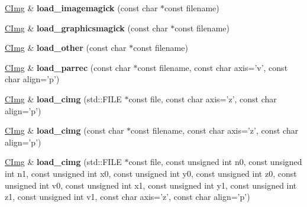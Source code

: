 \begin{DoxyCompactItemize}
\item 
\hypertarget{structcimg__library_1_1_c_img_a3fcf726ab135a8f5fba0cbb0acaaa625}{\hyperlink{structcimg__library_1_1_c_img}{C\-Img} \& {\bfseries load\-\_\-imagemagick} (const char $\ast$const filename)}\label{structcimg__library_1_1_c_img_a3fcf726ab135a8f5fba0cbb0acaaa625}

\item 
\hypertarget{structcimg__library_1_1_c_img_ac74be1e90df344dcc97370a3a4fe8f2b}{\hyperlink{structcimg__library_1_1_c_img}{C\-Img} \& {\bfseries load\-\_\-graphicsmagick} (const char $\ast$const filename)}\label{structcimg__library_1_1_c_img_ac74be1e90df344dcc97370a3a4fe8f2b}

\item 
\hypertarget{structcimg__library_1_1_c_img_a170595a3b1567358f3958601cae432e8}{\hyperlink{structcimg__library_1_1_c_img}{C\-Img} \& {\bfseries load\-\_\-other} (const char $\ast$const filename)}\label{structcimg__library_1_1_c_img_a170595a3b1567358f3958601cae432e8}

\item 
\hypertarget{structcimg__library_1_1_c_img_ac1d1998eb076fee2367bda54fe250234}{\hyperlink{structcimg__library_1_1_c_img}{C\-Img} \& {\bfseries load\-\_\-parrec} (const char $\ast$const filename, const char axis='v', const char align='p')}\label{structcimg__library_1_1_c_img_ac1d1998eb076fee2367bda54fe250234}

\item 
\hypertarget{structcimg__library_1_1_c_img_a6bc661ebae0d666bdf21535ed8b39efc}{\hyperlink{structcimg__library_1_1_c_img}{C\-Img} \& {\bfseries load\-\_\-cimg} (std\-::\-F\-I\-L\-E $\ast$const file, const char axis='z', const char align='p')}\label{structcimg__library_1_1_c_img_a6bc661ebae0d666bdf21535ed8b39efc}

\item 
\hypertarget{structcimg__library_1_1_c_img_abe1cf583e9743a18545cf5199158d353}{\hyperlink{structcimg__library_1_1_c_img}{C\-Img} \& {\bfseries load\-\_\-cimg} (const char $\ast$const filename, const char axis='z', const char align='p')}\label{structcimg__library_1_1_c_img_abe1cf583e9743a18545cf5199158d353}

\item 
\hypertarget{structcimg__library_1_1_c_img_a0e6f3271b8b02ac971675e7703255917}{\hyperlink{structcimg__library_1_1_c_img}{C\-Img} \& {\bfseries load\-\_\-cimg} (std\-::\-F\-I\-L\-E $\ast$const file, const unsigned int n0, const unsigned int n1, const unsigned int x0, const unsigned int y0, const unsigned int z0, const unsigned int v0, const unsigned int x1, const unsigned int y1, const unsigned int z1, const unsigned int v1, const char axis='z', const char align='p')}\label{structcimg__library_1_1_c_img_a0e6f3271b8b02ac971675e7703255917}


\end{DoxyCompactItemize}
